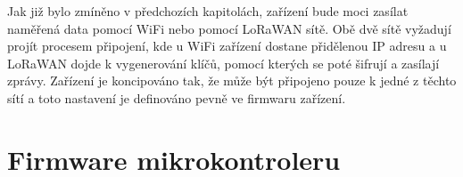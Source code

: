 Jak již bylo zmíněno v předchozích kapitolách, zařízení bude moci zasílat naměřená data pomocí WiFi nebo pomocí LoRaWAN sítě. Obě dvě sítě vyžadují projít procesem připojení, kde u WiFi zařízení dostane přidělenou IP adresu a u LoRaWAN dojde k vygenerování klíčů, pomocí kterých se poté šifrují a zasílají zprávy. Zařízení je koncipováno tak, že může být připojeno pouze k jedné z těchto sítí a toto nastavení je definováno pevně ve firmwaru zařízení. 

\section{Firmware mikrokontroleru}

